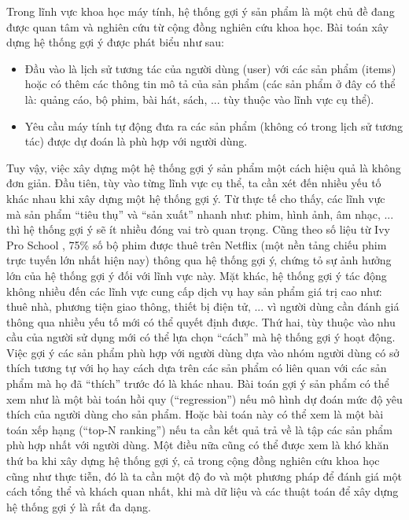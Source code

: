 Trong lĩnh vực khoa học máy tính, hệ thống gợi ý sản phẩm là một chủ đề 
đang được quan tâm và nghiên cứu từ cộng đồng nghiên cứu khoa học.
Bài toán xây dựng hệ thống gợi ý được phát biểu như sau:
\begin{itemize}
    \item Đầu vào là lịch sử tương tác của người dùng (user) với các sản phẩm (items) hoặc có thêm các thông tin mô tả của sản phẩm 
    (các sản phẩm ở đây có thể là: quảng cáo, bộ phim, bài hát, sách, ... tùy thuộc vào lĩnh vực cụ thể).
    \item Yêu cầu máy tính tự động đưa ra các sản phẩm (không có trong lịch sử tương tác) được dự đoán là phù hợp với người dùng.
\end{itemize}

Tuy vậy, việc xây dựng một hệ thống gợi ý sản phẩm một cách hiệu quả là không đơn giản.
Đầu tiên, tùy vào từng lĩnh vực cụ thể, ta cần xét đến nhiều yếu tố khác nhau khi xây dựng một hệ thống gợi ý.
Từ thực tế cho thấy, các lĩnh vực mà sản phẩm ``tiêu thụ'' và ``sản xuất'' nhanh như: phim, hình ảnh, âm nhạc, ... 
thì hệ thống gợi ý sẽ ít nhiều đóng vai trò quan trọng. 
Cũng theo số liệu từ Ivy Pro School \cite{ivy}, 75\% số bộ phim được thuê trên Netflix (một nền tảng chiếu phim trực tuyến lớn nhất hiện nay) thông qua hệ thống gợi ý, chứng tỏ sự ảnh hưởng lớn của hệ thống gợi ý đối với lĩnh vực này. 
Mặt khác, hệ thống gợi ý tác động không nhiều đến các lĩnh vực cung cấp dịch vụ hay sản phẩm giá trị cao như:
thuê nhà, phương tiện giao thông, thiết bị điện tử, ... vì người dùng cần đánh giá thông qua nhiều yếu tố mới có thể quyết định được. 
Thứ hai, tùy thuộc vào nhu cầu của người sử dụng mới có thể lựa chọn ``cách'' mà hệ thống gợi ý hoạt động.
Việc gợi ý các sản phẩm phù hợp với người dùng dựa vào nhóm người dùng có sở thích tương tự với họ 
hay cách dựa trên các sản phẩm có liên quan với các sản phẩm mà họ đã ``thích'' trước đó là khác nhau.
Bài toán gợi ý sản phẩm có thể xem như là một bài toán hồi quy (``regression'') 
nếu mô hình dự đoán mức độ yêu thích của người dùng cho sản phẩm.
Hoặc bài toán này có thể xem là một bài toán xếp hạng (``top-N ranking'') nếu ta cần kết quả trả về 
là tập các sản phẩm phù hợp nhất với người dùng.
Một điều nữa cũng có thể được xem là khó khăn thứ ba khi xây dựng hệ thống gợi ý, cả trong cộng đồng nghiên cứu khoa học cũng như thực tiễn, 
đó là ta cần một độ đo và một phương pháp để đánh giá một cách tổng thể và khách quan nhất, 
khi mà dữ liệu và các thuật toán để xây dựng hệ thống gợi ý là rất đa dạng.

